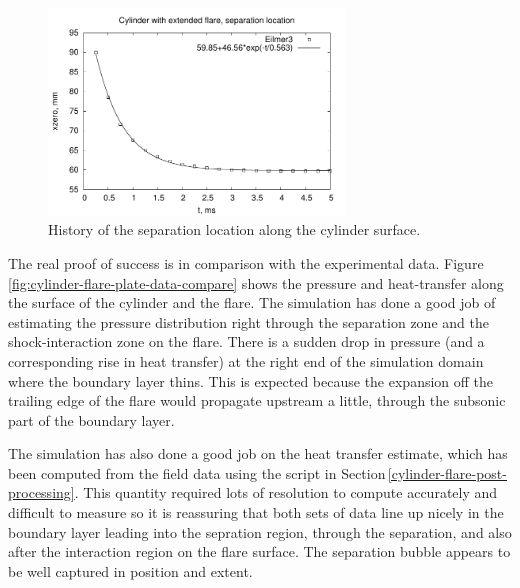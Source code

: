 \begin{figure}[htb]
 \centering
 \includegraphics[width=0.7\textwidth]{../2D/cylinder-flare/separation-location.pdf}
 \caption{History of the separation location along the cylinder surface.}
 \label{fig:cylinder-flare-separation-point}
\end{figure}

\clearpage

\medskip
The real proof of success is in comparison with the experimental data.
Figure\,\ref{fig:cylinder-flare-plate-data-compare} shows the pressure and heat-transfer
along the surface of the cylinder and the flare.
The simulation has done a good job of estimating the pressure distribution right 
through the separation zone and the shock-interaction zone on the flare.
There is a sudden drop in pressure (and a corresponding rise in heat transfer)
at the right end of the simulation domain where the boundary layer thins.
This is expected because the expansion off the trailing edge of the flare
would propagate upstream a little, through the subsonic part of the boundary layer.

\medskip
The simulation has also done a good job on the heat transfer estimate,
which has been computed from the field data using the script in Section\,\ref{cylinder-flare-post-processing}.
This quantity required lots of resolution to compute accurately and 
difficult to measure so it is reassuring that both
sets of data line up nicely in the boundary layer leading into the sepration region,
through the separation, and also after the interaction region on the flare surface.
The separation bubble appears to be well captured in position and extent.


